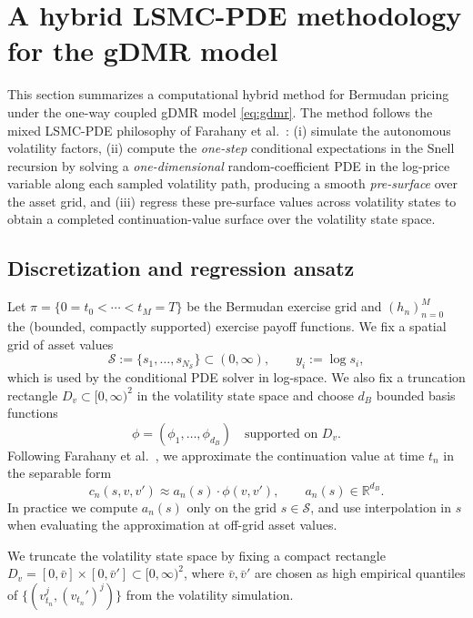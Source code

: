 \documentclass[10pt]{article}
\theoremstyle{plain}
\theoremstyle{definition}
\theoremstyle{remark}
\begin{document}
\section{A hybrid LSMC-PDE methodology for the gDMR model}
\label{sec:hybrid-method}

This section summarizes a computational hybrid method for Bermudan pricing under the one-way coupled
gDMR model \eqref{eq:gdmr}. The method follows the mixed LSMC-PDE philosophy of Farahany et al.~\citet{farahany2020mixing}:
(i) simulate the autonomous volatility factors, (ii) compute the \emph{one-step} conditional expectations in the Snell recursion by
solving a \emph{one-dimensional} random-coefficient PDE in the log-price variable along each sampled volatility path, producing a smooth
\emph{pre-surface} over the asset grid, and (iii) regress these pre-surface values across volatility states to obtain a completed
continuation-value surface over the volatility state space.

\subsection{Discretization and regression ansatz}
Let $\pi=\{0=t_0<\cdots<t_M=T\}$ be the Bermudan exercise grid and $(h_n)_{n=0}^M$ the (bounded, compactly supported) exercise payoff functions.
We fix a spatial grid of asset values
\[
\mathcal S := \{s_1,\dots,s_{N_{\mathcal S}}\}\subset (0,\infty),\qquad y_i:=\log s_i,
\]
which is used by the conditional PDE solver in log-space. We also fix a truncation rectangle $D_v\subset[0,\infty)^2$ in the volatility
state space and choose $d_B$ bounded basis functions
\[
\phi=(\phi_1,\dots,\phi_{d_B}) \quad\text{supported on }D_v.
\]
Following Farahany et al.~\citet{farahany2020mixing}, we approximate the continuation value at time $t_n$ in the separable form
\begin{equation}
c_n(s,v,v') \approx a_n(s)\cdot \phi(v,v'),\qquad a_n(s)\in\mathbb R^{d_B}.
\label{eq:sep-ansatz}
\end{equation}
In practice we compute $a_n(s)$ only on the grid $s\in\mathcal S$, and use interpolation in $s$ when evaluating the approximation at
off-grid asset values.

We truncate the volatility state space by fixing a compact rectangle 
$D_v=[0,\bar v]\times[0,\bar v']\subset[0,\infty)^2$, where $\bar v,\bar v'$ are chosen as high empirical quantiles of $\{(v_{t_n}^j,(v_{t_n}')^j)\}$ from the volatility simulation.
\end{document}
